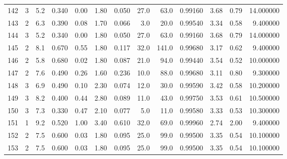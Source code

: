 \begin{tabular}{lrrrrrrrrrrrr}
142  &        3 &            5.2 &             0.340 &         0.00 &            1.80 &      0.050 &                 27.0 &                  63.0 &  0.99160 &  3.68 &       0.79 &  14.000000 \\
143  &        2 &            6.3 &             0.390 &         0.08 &            1.70 &      0.066 &                  3.0 &                  20.0 &  0.99540 &  3.34 &       0.58 &   9.400000 \\
144  &        3 &            5.2 &             0.340 &         0.00 &            1.80 &      0.050 &                 27.0 &                  63.0 &  0.99160 &  3.68 &       0.79 &  14.000000 \\
145  &        2 &            8.1 &             0.670 &         0.55 &            1.80 &      0.117 &                 32.0 &                 141.0 &  0.99680 &  3.17 &       0.62 &   9.400000 \\
146  &        2 &            5.8 &             0.680 &         0.02 &            1.80 &      0.087 &                 21.0 &                  94.0 &  0.99440 &  3.54 &       0.52 &  10.000000 \\
147  &        2 &            7.6 &             0.490 &         0.26 &            1.60 &      0.236 &                 10.0 &                  88.0 &  0.99680 &  3.11 &       0.80 &   9.300000 \\
148  &        3 &            6.9 &             0.490 &         0.10 &            2.30 &      0.074 &                 12.0 &                  30.0 &  0.99590 &  3.42 &       0.58 &  10.200000 \\
149  &        3 &            8.2 &             0.400 &         0.44 &            2.80 &      0.089 &                 11.0 &                  43.0 &  0.99750 &  3.53 &       0.61 &  10.500000 \\
150  &        3 &            7.3 &             0.330 &         0.47 &            2.10 &      0.077 &                  5.0 &                  11.0 &  0.99580 &  3.33 &       0.53 &  10.300000 \\
151  &        1 &            9.2 &             0.520 &         1.00 &            3.40 &      0.610 &                 32.0 &                  69.0 &  0.99960 &  2.74 &       2.00 &   9.400000 \\
152  &        2 &            7.5 &             0.600 &         0.03 &            1.80 &      0.095 &                 25.0 &                  99.0 &  0.99500 &  3.35 &       0.54 &  10.100000 \\
153  &        2 &            7.5 &             0.600 &         0.03 &            1.80 &      0.095 &                 25.0 &                  99.0 &  0.99500 &  3.35 &       0.54 &  10.100000 \\

\end{tabular}

